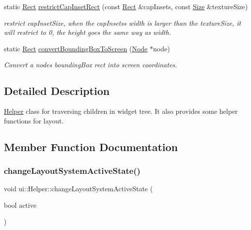 \begin{DoxyCompactItemize}
\item 
static \hyperlink{classRect}{Rect} \hyperlink{classui_1_1Helper_a54622805ac5169a7863ca4a1ea258f38}{restrict\+Cap\+Inset\+Rect} (const \hyperlink{classRect}{Rect} \&cap\+Insets, const \hyperlink{classSize}{Size} \&texture\+Size)
\begin{DoxyCompactList}\small\item\em restrict cap\+Inset\+Size, when the cap\+Insets\textquotesingle{}s width is larger than the texture\+Size, it will restrict to 0, the height goes the same way as width. \end{DoxyCompactList}\item 
static \hyperlink{classRect}{Rect} \hyperlink{classui_1_1Helper_acec5515b864cf02f7407591a38f6f6fd}{convert\+Bounding\+Box\+To\+Screen} (\hyperlink{classNode}{Node} $\ast$node)
\begin{DoxyCompactList}\small\item\em Convert a node\textquotesingle{}s bounding\+Box rect into screen coordinates. \end{DoxyCompactList}\end{DoxyCompactItemize}


\subsection{Detailed Description}
\hyperlink{classui_1_1Helper}{Helper} class for traversing children in widget tree. It also provides some helper functions for layout. 

\subsection{Member Function Documentation}
\mbox{\label{classui_1_1Helper_a5b96f52949a9150eb4daf14b47deea2d}} 
\subsubsection{\texorpdfstring{change\+Layout\+System\+Active\+State()}{changeLayoutSystemActiveState()}\hspace{0.1cm}{\footnotesize\ttfamily [1/2]}}
{\footnotesize\ttfamily void ui\+::\+Helper\+::change\+Layout\+System\+Active\+State (\begin{DoxyParamCaption}\item[{bool}]{active }\end{DoxyParamCaption})\hspace{0.3cm}{\ttfamily [static]}}

